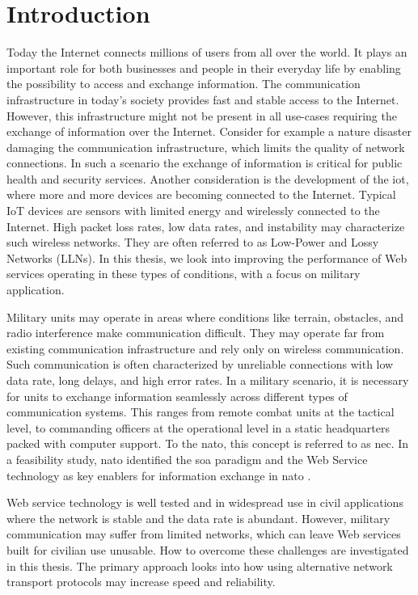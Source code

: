 
\chapter{Introduction}

Today the Internet connects millions of users from all over the world. It plays
an important role for both businesses and people in their everyday life by
enabling the possibility to access and exchange information. The communication
infrastructure in today's society provides fast and stable access to the
Internet. However, this infrastructure might not be present in all use-cases
requiring the exchange of information over the Internet. Consider for example a
nature disaster damaging the communication infrastructure, which limits the
quality of network connections. In such a scenario the exchange of information
is critical for public health and security services. Another consideration is
the development of the \gls{iot}, where more and more devices are becoming
connected to the Internet. Typical IoT devices are sensors with limited energy
and wirelessly connected to the Internet. High packet loss rates, low data
rates, and instability may characterize such wireless networks. They are often
referred to as Low-Power and Lossy Networks (LLNs). In this thesis, we look into
improving the performance of Web services operating in these types of
conditions, with a focus on military application.


Military units may operate in areas where conditions like terrain, obstacles,
and radio interference make communication difficult. They may operate far from
existing communication infrastructure and rely only on wireless communication.
Such communication is often characterized by unreliable connections with low
data rate, long delays, and high error rates. In a military scenario, it is
necessary for units to exchange information seamlessly across different types of
communication systems. This ranges from remote combat units at the tactical
level, to commanding officers at the operational level in a static headquarters
packed with computer support. To the \gls{nato}, this concept is referred to as
\gls{nec}. In a feasibility study, \gls{nato} identified the \gls{soa} paradigm
and the Web Service technology as key enablers for information exchange in
\gls{nato} \cite{nnec-study}.

Web service technology is well tested and in widespread use in civil
applications where the network is stable and the data rate is abundant. However,
military communication may suffer from limited networks, which can leave Web
services built for civilian use unusable. How to overcome these challenges are
investigated in this thesis. The primary approach looks into how using
alternative network transport protocols may increase speed and reliability.

